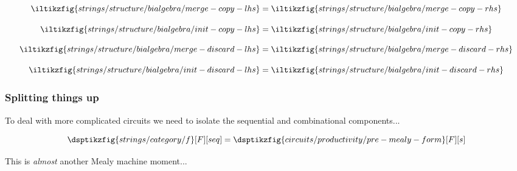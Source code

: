 \begin{frame}
    \begin{minipage}{0.28\textwidth}
        \begin{equation*}
            \iltikzfig{strings/structure/bialgebra/merge-copy-lhs}
            =
            \iltikzfig{strings/structure/bialgebra/merge-copy-rhs}
        \end{equation*}
    \end{minipage}
    \begin{minipage}{0.23\textwidth}
        \begin{equation*}
            \iltikzfig{strings/structure/bialgebra/init-copy-lhs}
            =
            \iltikzfig{strings/structure/bialgebra/init-copy-rhs}
        \end{equation*}
    \end{minipage}
    \begin{minipage}{0.23\textwidth}
        \begin{equation*}
            \iltikzfig{strings/structure/bialgebra/merge-discard-lhs}
            =
            \iltikzfig{strings/structure/bialgebra/merge-discard-rhs}
        \end{equation*}
    \end{minipage}
    \begin{minipage}{0.2\textwidth}
        \begin{equation*}
            \iltikzfig{strings/structure/bialgebra/init-discard-lhs}
            =
            \iltikzfig{strings/structure/bialgebra/init-discard-rhs}
        \end{equation*}
    \end{minipage}
\end{frame}
\begin{frame}
    \frametitle{Splitting things up}

    To deal with more complicated circuits we need to \alert{isolate} the
    sequential and combinational components...

    \centering
    \wait
    \[
        \dsptikzfig{strings/category/f}[F][seq]
        =
        \dsptikzfig{circuits/productivity/pre-mealy-form}[F][s]
    \]

    \wait
    This is \emph{almost} another Mealy machine moment...

\end{frame}
